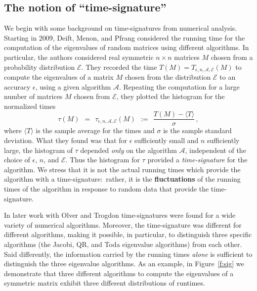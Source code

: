 \documentclass{llncs}
\numberwithin{equation}{section}
\renewcommand\({\left(}
\renewcommand\){\right)}
\begin{document}
\subsection*{The notion of   ``time-signature''}


We begin with some background on time-signatures from numerical analysis. Starting in 2009, Deift, Menon, and  Pfrang \cite{eigencite4}  considered the running time for the computation of the eigenvalues of random matrices using different algorithms.  In particular, the authors considered real symmetric $n\times n$ matrices $M$ chosen from a probability distribution $\mathcal E$.   They recorded the time $T(M)=T_{\epsilon,n,{\mathcal A},{\mathcal E}}(M)$ to compute the eigenvalues of a matrix $M$ chosen from the distribution $\mathcal E$ to an accuracy $\epsilon$, using  a given  algorithm $\mathcal A$.  Repeating the computation for a large number of matrices $M$ chosen from $\mathcal E$, they plotted the histogram for the normalized times
 \begin{equation}\label{normalizedtimes}
   \tau(M) \ \ = \ \ \tau_{\epsilon,n,{\mathcal A},{\mathcal E}}(M) \ \ := \ \ \frac{T(M)-\langle T\rangle}{\sigma}\,,
 \end{equation}
where $\langle T \rangle$ is the sample average for the times and $\sigma$ is the sample standard deviation.  What they found was that for $\epsilon$ sufficiently small and $n$ sufficiently large, the histogram of $\tau$ depended {\it  only} on the algorithm $\mathcal A$, independent of the choice of $\epsilon$, $n$, and  $\mathcal E$.  Thus the histogram for $\tau$ provided a {\it time-signature} for the algorithm.  We stress that it is not the actual running times which provide the algorithm with a time-signature:~rather, it is the  {\bf fluctuations} of the running times of the algorithm in response to random data that provide the time-signature.

In later work  with Olver and Trogdon \cite{eigencite1,eigencite3,eigencite2} time-signatures  were found for a wide variety of numerical algorithms.
Moreover, the time-signature was different for different algorithms, making it possible, in particular, to distinguish three specific algorithms (the Jacobi, QR, and Toda  eigenvalue algorithms) from each other.
Said differently, the information carried by the running times {\it alone} is sufficient to distinguish the three eigenvalue algorithms.
As an example, in Figure~\ref{f:sig} we demonstrate that three different algorithms to compute the eigenvalues of a symmetric matrix exhibit three different distributions of runtimes.
\end{document}
